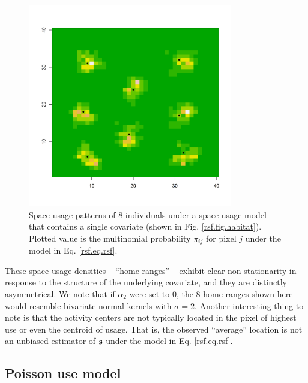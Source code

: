 \begin{figure}
\centering
\includegraphics[width=3.5in,height=3.5in]{Ch10b/figs/homeranges8}
\caption{Space usage patterns of 8 individuals under a space usage
  model that contains a single covariate (shown in
  Fig. \ref{rsf.fig.habitat}). Plotted value is the multinomial
  probability $\pi_{ij}$ for pixel $j$ under the model in Eq. \ref{rsf.eq.rsf}.
}
\label{rsf.fig.homeranges}
\end{figure}
These space usage densities -- ``home ranges'' -- exhibit clear
non-stationarity in response to the structure of the underlying
covariate, and they are distinctly asymmetrical.  We note that if
$\alpha_{2}$ were set to 0, the 8 home ranges shown here would
resemble bivariate normal kernels with $\sigma = 2$.  Another
interesting thing to note is that the activity centers are not
typically located in the pixel of highest use or even the centroid of
usage. That is, the observed ``average'' location is not an
unbiased estimator of ${\bf s}$ under the model in
Eq. \ref{rsf.eq.rsf}. 



\subsection{Poisson use model}

